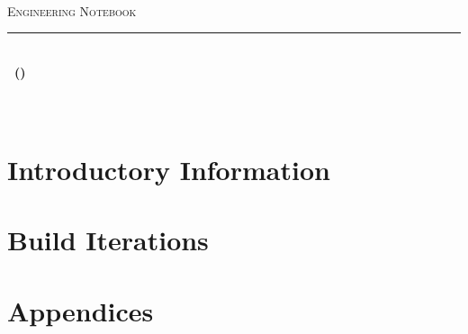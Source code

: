 \documentclass[
12pt, %
english %
]
{SIGBotsEngineeringNotebook} %
\begin{document}
\frontmatter %
\begin{titlepage}
\begin{center}

\textsc{\LARGE \teamname}\\[1cm]
\textsc{\Large Engineering Notebook}\\[0.5cm]
\hrule %
\hfill \\[1.5cm] %
{\huge
\bfseries
\currentgame\ (\currentseason)
}
\\[1.5cm]
\\[1cm]
\textsc{\Large \teamnumber}\\[0.5cm] %

\vfill
\end{center}
\end{titlepage}
\afterpage{\blankpage}

\clearpage %
\pagestyle{plain}
\tableofcontents
\clearpage
\listoffigures

\mainmatter %

\part{Introductory Information}
\pagestyle{Intro} %
\begin{Introductory Material}
\introtrue %

%
%
%
%

\end{Introductory Material}
\introfalse

\part{Build Iterations}
\pagestyle{Iterations} %

%

\part{Appendices}
\appendix
\appendixtrue
\pagestyle{Appendix}

%

\printbibliography[heading=bibintoc]
\end{document}
